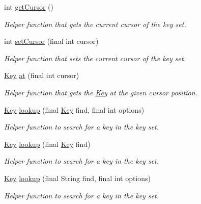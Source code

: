 \begin{DoxyCompactItemize}
int \hyperlink{classorg_1_1libelektra_1_1KeySet_a37e6d574b4595021a6cc732e325219e1}{get\+Cursor} ()
\begin{DoxyCompactList}\small\item\em Helper function that gets the current cursor of the key set. \end{DoxyCompactList}\item 
int \hyperlink{classorg_1_1libelektra_1_1KeySet_adb3caad35c8dfcd1934d7cd32ff0ca4a}{set\+Cursor} (final int cursor)
\begin{DoxyCompactList}\small\item\em Helper function that sets the current cursor of the key set. \end{DoxyCompactList}\item 
\hyperlink{classorg_1_1libelektra_1_1Key}{Key} \hyperlink{classorg_1_1libelektra_1_1KeySet_a125d86734bd428c9eb1f937eb1b7ab74}{at} (final int cursor)
\begin{DoxyCompactList}\small\item\em Helper function that gets the \hyperlink{classorg_1_1libelektra_1_1Key}{Key} at the given cursor position. \end{DoxyCompactList}\item 
\hyperlink{classorg_1_1libelektra_1_1Key}{Key} \hyperlink{classorg_1_1libelektra_1_1KeySet_a6fb319a768b1cb43464154a93f9a2e93}{lookup} (final \hyperlink{classorg_1_1libelektra_1_1Key}{Key} find, final int options)
\begin{DoxyCompactList}\small\item\em Helper function to search for a key in the key set. \end{DoxyCompactList}\item 
\hyperlink{classorg_1_1libelektra_1_1Key}{Key} \hyperlink{classorg_1_1libelektra_1_1KeySet_a9ff1d475fd6ae316515c4c1cc173991b}{lookup} (final \hyperlink{classorg_1_1libelektra_1_1Key}{Key} find)
\begin{DoxyCompactList}\small\item\em Helper function to search for a key in the key set. \end{DoxyCompactList}\item 
\hyperlink{classorg_1_1libelektra_1_1Key}{Key} \hyperlink{classorg_1_1libelektra_1_1KeySet_aa17a04907eb8c8d2a9a488788d0039ea}{lookup} (final String find, final int options)
\begin{DoxyCompactList}\small\item\em Helper function to search for a key in the key set. \end{DoxyCompactList}\item 

\end{DoxyCompactItemize}
